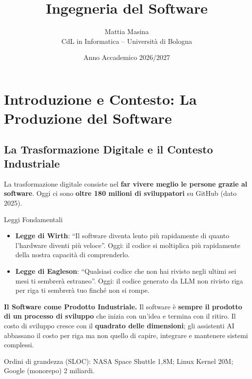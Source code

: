 \documentclass[12pt]{extarticle}
\title{Ingegneria del Software}
\author{Mattia Masina\\CdL in Informatica -- Università di Bologna}
\date{Anno Accademico 2026/2027}
\begin{document}
\maketitle
\newpage

\tableofcontents
\newpage

\section{Introduzione e Contesto: La Produzione del Software}

\subsection{La Trasformazione Digitale e il Contesto Industriale}
\noindent La trasformazione digitale consiste nel \textbf{far vivere meglio le persone grazie al software}. Oggi ci sono \textbf{oltre 180 milioni di sviluppatori} su GitHub (dato 2025).

\begin{cbox}{Leggi Fondamentali}
\begin{itemize}
    \item \textbf{Legge di Wirth}: ``Il software diventa lento più rapidamente di quanto l'hardware diventi più veloce''. Oggi: il codice si moltiplica più rapidamente della nostra capacità di comprenderlo.
    \item \textbf{Legge di Eagleson}: ``Qualsiasi codice che non hai rivisto negli ultimi sei mesi ti sembrerà estraneo''. Oggi: il codice generato da LLM non rivisto riga per riga ti sembrerà tuo finché non si rompe.
\end{itemize}
\end{cbox}

\noindent \textbf{Il Software come Prodotto Industriale.} Il software è \textbf{sempre il prodotto di un processo di sviluppo} che inizia con un'idea e termina con il ritiro. Il costo di sviluppo cresce con il \textbf{quadrato delle dimensioni}; gli assistenti AI abbassano il costo per riga ma non quello di capire, integrare e mantenere sistemi complessi.

\noindent Ordini di grandezza (SLOC): NASA Space Shuttle 1,8M; Linux Kernel 20M; Google (monorepo) 2 miliardi.
\end{document}
